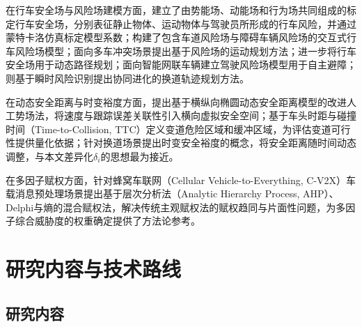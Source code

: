 在行车安全场与风险场建模方面，\citet{lvzhuangzhuang2024}建立了由势能场、动能场和行为场共同组成的标定行车安全场，分别表征静止物体、运动物体与驾驶员所形成的行车风险，并通过蒙特卡洛仿真标定模型系数；\citet{lifangqi2025}构建了包含车道风险场与障碍车辆风险场的交互式行车风险场模型；\citet{riskfield2024}面向多车冲突场景提出基于风险场的运动规划方法；\citet{drivingsafetyfield2023}进一步将行车安全场用于动态路径规划；\citet{riskfieldmodel2022}面向智能网联车辆建立驾驶风险场模型用于自主避障；\citet{coevorisk2023}则基于瞬时风险识别提出协同进化的换道轨迹规划方法。

在动态安全距离与时变裕度方面，\citet{zhaohongzhuan2025}提出基于横纵向椭圆动态安全距离模型的改进人工势场法，将速度与跟踪误差关联性引入横向虚拟安全空间；\citet{renhongzheng2025}基于车头时距与碰撞时间（Time-to-Collision, TTC）定义变道危险区域和缓冲区域，为评估变道可行性提供量化依据；\citet{timevariantmargin2020}针对换道场景提出时变安全裕度的概念，将安全距离随时间动态调整，与本文差异化$\delta_i$的思想最为接近。

在多因子赋权方面，\citet{linjiarui2021}针对蜂窝车联网（Cellular Vehicle-to-Everything, C-V2X）车载消息预处理场景提出基于层次分析法（Analytic Hierarchy Process, AHP）、Delphi与熵的混合赋权法，解决传统主观赋权法的赋权趋同与片面性问题，为多因子综合威胁度的权重确定提供了方法论参考。



\section{研究内容与技术路线}

\subsection{研究内容}

